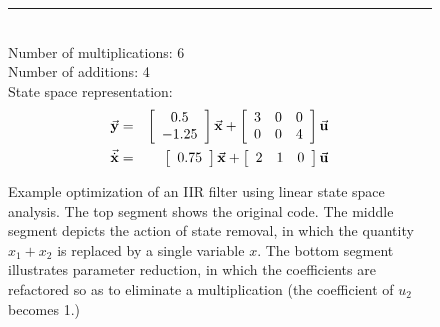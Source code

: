 \begin{figure}[t]
\begin{singlespace}
{\begin{minipage}{3.5in}
\begin{eqnarray*}
\end{eqnarray*}
\vspace{-3pt} ~ \\
\hrule
\vspace{12pt} ~ \\
Number of multiplications: 6 \\
Number of additions: 4 \\
State space representation:
\begin{eqnarray*}
\small
\vec{\mathbf{y}} & = & \left [ \begin{array} {cc} 0.5 \\ -1.25
\end{array} \right ] \vec{\mathbf{x}} + \left [ \begin{array} {ccc} 3 & 0 & 0 \\ 0 & 0 & 4 \end{array} \right
 ] \vec{\mathbf{u}} \\
\vec{\dot{\mathbf{x}}} & = & \left [ \begin{array} {cc} 0.75
\end{array} \right ] \vec{\mathbf{x}} + \left [ \begin{array} {ccc} 2 & 1 & 0 \end{array} \right ] \vec{\mathbf{u}}
\end{eqnarray*}
\end{minipage}}
\end{singlespace}
\begin{center}
\vspace{-24pt}

\caption{Example optimization of an IIR filter using linear state
space analysis.  The top segment shows the original code.  The middle
segment depicts the action of state removal, in which the quantity
$x_1 + x_2$ is replaced by a single variable $x$.  The bottom segment
illustrates parameter reduction, in which the coefficients are
refactored so as to eliminate a multiplication (the coefficient of
$u_2$ becomes 1.)\protect\label{fig:opt-seq}}
\end{center}
\vspace{-12pt}
\end{figure}
